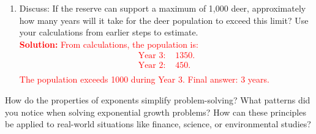 \documentclass[9pt]{article}
\begin{document}
\begin{tcolorbox}
\begin{enumerate}[itemsep=.5em]
    \item Discuss: If the reserve can support a maximum of 1,000 deer, approximately how many years will it take for the deer population to exceed this limit? Use your calculations from earlier steps to estimate.\\
    \textcolor{red}{\textbf{Solution:} From calculations, the population is:
    \begin{align*}
    \text{Year 3: } & 1350. \\
    \text{Year 2: } & 450. \\
    \end{align*}
    The population exceeds 1000 during Year 3. Final answer: \(3\) years.}
\end{enumerate}
\end{tcolorbox}

\begin{tcolorbox}[colframe=black!60, colback=white, 
coltitle=black, colbacktitle=black!15, fonttitle=\bfseries\Large, 
title=Reflection, halign title=center, left=10pt, right=10pt, top=10pt, bottom=80pt]
How do the properties of exponents simplify problem-solving? What patterns did you notice when solving exponential growth problems? How can these principles be applied to real-world situations like finance, science, or environmental studies?
\end{tcolorbox}
\end{document}
